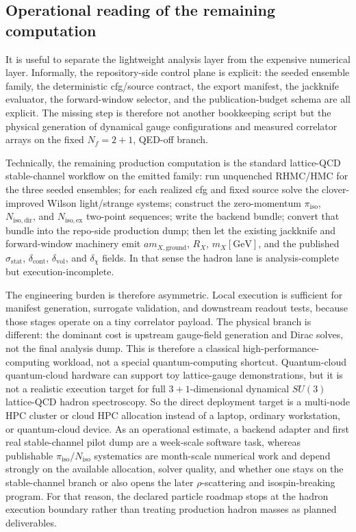 \documentclass[11pt]{article}
\begin{document}
\subsection{Operational reading of the remaining computation}

It is useful to separate the lightweight analysis layer from the expensive numerical layer.
Informally, the repository-side control plane is explicit: the seeded ensemble family, the
deterministic cfg/source contract, the export manifest, the jackknife evaluator, the forward-window
selector, and the publication-budget schema are all explicit. The missing step is therefore not
another bookkeeping script but the physical generation of dynamical gauge configurations and
measured correlator arrays on the fixed \(N_f=2+1\), QED-off branch.

Technically, the remaining production computation is the standard lattice-QCD stable-channel
workflow on the emitted family: run unquenched RHMC/HMC for the three seeded ensembles; for each
realized cfg and fixed source solve the clover-improved Wilson light/strange systems; construct the
zero-momentum \(\pi_{\mathrm{iso}}\), \(N_{\mathrm{iso,dir}}\), and \(N_{\mathrm{iso,ex}}\)
two-point sequences; write the backend bundle; convert that bundle into the repo-side production
dump; then let the existing jackknife and forward-window machinery emit
\(a m_{X,\mathrm{ground}}\), \(R_X\), \(m_X[\mathrm{GeV}]\), and the published
\(\sigma_{\mathrm{stat}}\), \(\delta_{\mathrm{cont}}\), \(\delta_{\mathrm{vol}}\), and
\(\delta_{\chi}\) fields. In that sense the hadron lane is analysis-complete but
execution-incomplete.

The engineering burden is therefore asymmetric. Local execution is sufficient for manifest
generation, surrogate validation, and downstream readout tests, because those stages operate on a
tiny correlator payload. The physical branch is different: the dominant cost is upstream
gauge-field generation and Dirac solves, not the final analysis dump. This is therefore a classical
high-performance-computing workload, not a special quantum-computing shortcut. Quantum-cloud
quantum-cloud hardware can support toy lattice-gauge demonstrations, but it is not a
realistic execution target for full \(3+1\)-dimensional dynamical \(SU(3)\) lattice-QCD hadron
spectroscopy. So the direct deployment target is a multi-node HPC cluster or cloud HPC allocation
instead of a laptop, ordinary workstation, or quantum-cloud device. As an operational estimate, a backend adapter and first real stable-channel pilot dump
are a week-scale software task, whereas publishable \(\pi_{\mathrm{iso}}/N_{\mathrm{iso}}\)
systematics are month-scale numerical work and depend strongly on the available allocation, solver
quality, and whether one stays on the stable-channel branch or also opens the later
\(\rho\)-scattering and isospin-breaking program. For that reason, the declared particle roadmap
stops at the hadron execution boundary rather than treating production hadron masses as planned
deliverables.
\end{document}

